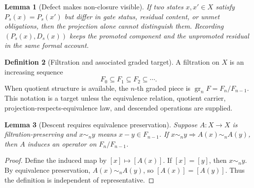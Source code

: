 \documentclass[11pt]{article}
\theoremstyle{definition}
\newtheorem{definition}{Definition}[section]
\theoremstyle{plain}
\newtheorem{lemma}[definition]{Lemma}
\theoremstyle{remark}
\begin{document}
\begin{lemma}[Defect makes non-closure visible]
If two states \(x,x'\in X\) satisfy \(P_s(x)=P_s(x')\) but differ in gate
status, residual content, or unmet obligations, then the projection alone
cannot distinguish them. Recording \((P_s(x),D_s(x))\) keeps the promoted
component and the unpromoted residual in the same formal account.
\end{lemma}

\begin{definition}[Filtration and associated graded target]
A filtration on \(X\) is an increasing sequence
\[
F_0\subseteq F_1\subseteq F_2\subseteq\cdots .
\]
When quotient structure is available, the \(n\)-th graded piece is
\(\operatorname{gr}_nF=F_n/F_{n-1}\). This notation is a target unless the
equivalence relation, quotient carrier, projection-respects-equivalence law,
and descended operations are supplied.
\end{definition}

\begin{lemma}[Descent requires equivalence preservation]
Suppose \(A:X\to X\) is filtration-preserving and \(x\sim_n y\) means
\(x-y\in F_{n-1}\). If \(x\sim_n y \Rightarrow A(x)\sim_n A(y)\), then \(A\)
induces an operator on \(F_n/F_{n-1}\).
\end{lemma}
\begin{proof}
Define the induced map by \([x]\mapsto[A(x)]\). If \([x]=[y]\), then
\(x\sim_n y\). By equivalence preservation, \(A(x)\sim_n A(y)\), so
\([A(x)]=[A(y)]\). Thus the definition is independent of representative.
\end{proof}
\end{document}
